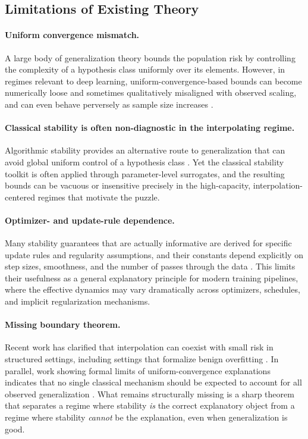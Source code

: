 \documentclass{article}
\numberwithin{equation}{section}
\begin{document}
\subsection{Limitations of Existing Theory}

\paragraph{Uniform convergence mismatch.}
A large body of generalization theory bounds the population risk by controlling the complexity of a hypothesis class uniformly over its elements. However, in regimes relevant to deep learning, uniform-convergence-based bounds can become numerically loose and sometimes qualitatively misaligned with observed scaling, and can even behave perversely as sample size increases \cite{NagarajanKolter2019}.

\paragraph{Classical stability is often non-diagnostic in the interpolating regime.}
Algorithmic stability provides an alternative route to generalization that can avoid global uniform control of a hypothesis class \cite{bousquet2002stability}. Yet the classical stability toolkit is often applied through parameter-level surrogates, and the resulting bounds can be vacuous or insensitive precisely in the high-capacity, interpolation-centered regimes that motivate the puzzle.

\paragraph{Optimizer- and update-rule dependence.}
Many stability guarantees that are actually informative are derived for specific update rules and regularity assumptions, and their constants depend explicitly on step sizes, smoothness, and the number of passes through the data \cite{pmlr-v48-hardt16}. This limits their usefulness as a general explanatory principle for modern training pipelines, where the effective dynamics may vary dramatically across optimizers, schedules, and implicit regularization mechanisms.

\paragraph{Missing boundary theorem.}
Recent work has clarified that interpolation can coexist with small risk in structured settings, including settings that formalize benign overfitting \cite{BartlettLongLugosiTsigler2020}. In parallel, work showing formal limits of uniform-convergence explanations indicates that no single classical mechanism should be expected to account for all observed generalization \cite{NagarajanKolter2019}. What remains structurally missing is a sharp theorem that separates a regime where stability \emph{is} the correct explanatory object from a regime where stability \emph{cannot} be the explanation, even when generalization is good.
\end{document}
